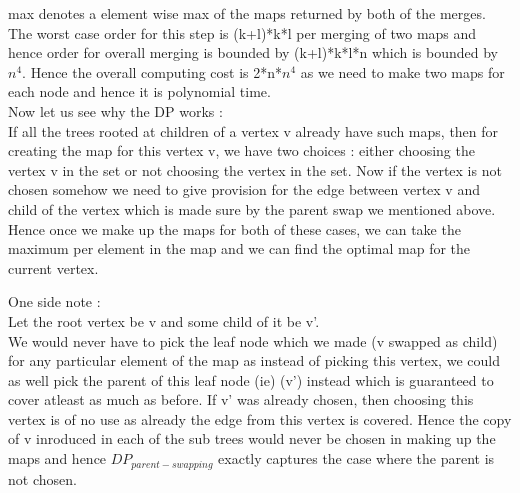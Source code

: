 \documentclass[solution,addpoints,12pt]{exam}
\begin{document}
\begin{questions}
\begin{parts}
max denotes a element wise max of the maps returned by both of the merges.
The worst case order for this step is (k+l)*k*l per merging of two maps and
hence order for overall merging is bounded by (k+l)*k*l*n which is bounded by $n^4$.
Hence the overall computing cost is 2*n*$n^4$ as we need to make two maps
for each node and hence it is polynomial time.\\

Now let us see why the DP works :\\
If all the trees rooted at children of a vertex v already have such maps,
then for creating the map for this vertex v, we have two choices : either
choosing the vertex v in the set or not choosing the vertex in the set. Now
if the vertex is not chosen somehow we need to give provision for the
edge between vertex v and child of the vertex which is made sure by the
parent swap we mentioned above. Hence once we make up the maps for
both of these cases, we can take the maximum per element in the map and we
can find the optimal map for the current vertex.

One side note :\\
Let the root vertex be v and some child of it be v'.\\
We would never have to pick the leaf node which we made (v swapped as child)
for any particular element of the map as instead of picking this vertex, we could
as well pick the parent of this leaf node (ie) (v') instead which is guaranteed
to cover atleast as much as before. If v' was already chosen, then choosing
this vertex is of no use as already the edge from this vertex is covered. Hence
the copy of v inroduced in each of the sub trees would never be chosen in
making up the maps and hence $DP_{parent-swapping}$ exactly captures the case
where the parent is not chosen.\\


\end{parts}
\end{questions}
\end{document}
